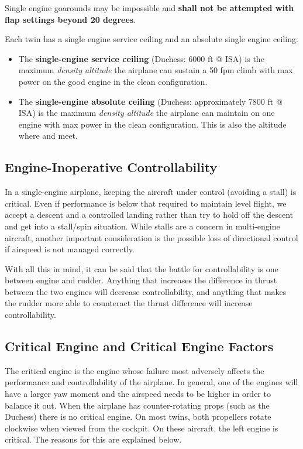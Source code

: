 Single engine goarounds may be impossible and \textbf{shall not be attempted with flap settings beyond 20 degrees}.

Each twin has a single engine service ceiling and an absolute single engine ceiling:

\begin{itemize}
\item The \textbf{single-engine service ceiling} (Duchess: 6000 ft @ ISA) is the maximum \emph{density altitude} the airplane can sustain a 50 fpm climb with max power on the good engine in the clean configuration.
\item The \textbf{single-engine absolute ceiling} (Duchess: approximately 7800 ft @ ISA) is the maximum \emph{density altitude} the airplane can maintain on one engine with max power in the clean configuration. This is also the altitude where \vyse
and \vxse meet.
\end{itemize}

\subsection{Engine-Inoperative Controllability}

In a single-engine airplane, keeping the aircraft under control (avoiding a stall) is critical. Even if performance is
below that required to maintain level flight, we accept a descent and a controlled landing rather than try to hold off
the descent and get into a stall/spin situation. While stalls are a concern in multi-engine aircraft, another important
consideration is the possible loss of directional control if airspeed is not managed correctly.

With all this in mind, it can be said that the battle for controllability is one between engine and rudder. Anything
that increases the difference in thrust between the two engines will decrease controllability, and anything that makes
the rudder more able to counteract the thrust difference will increase controllability.

\subsection{Critical Engine and Critical Engine Factors}

The critical engine is the engine whose failure most adversely affects the performance and controllability of the
airplane. In general, one of the engines will have a larger yaw moment and the airspeed needs to be higher in order
to balance it out. When the airplane has counter-rotating props (such as the Duchess) there is no critical engine. On
most twins, both propellers rotate clockwise when viewed from the cockpit. On these aircraft, the left engine is
critical. The reasons for this are explained below.

